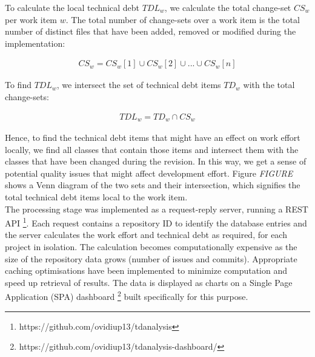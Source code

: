 \documentclass{mpaper}
\begin{document}
To calculate the local technical debt $TDL_{w}$, we calculate the total
change-set $CS_{w}$ per work item $w$. The total number of change-sets over a
work item is the total number of distinct files that have been added, removed or
modified during the implementation:

\begin{equation}
  \label{eq-td-changes}
  \begin{aligned}
    CS_{w} = CS_{w}[1] \cup CS_{w}[2] \cup ... \cup CS_{w}[n]
  \end{aligned}
\end{equation}

To find $TDL_{w}$, we intersect the set of technical debt items $TD_{w}$ with
the total change-sets:

\begin{equation}
  \label{eq-td-local}
  \begin{aligned}
    TDL_{w} = TD_{w} \cap CS_{w}
  \end{aligned}
\end{equation}

Hence, to find the technical debt items that might have an effect on work effort
locally, we find all classes that contain those items and intersect them with
the classes that have been changed during the revision. In this way, we get a
sense of potential quality issues that might affect development effort. Figure
\emph{FIGURE} shows a Venn diagram of the two sets and their intersection, which
signifies the total technical debt items local to the work item.\\

The processing stage was implemented as a request-reply server, running a REST
API \footnote{https://github.com/ovidiup13/tdanalysis}. Each request contains a
repository ID to identify the database entries and the server calculates the
work effort and technical debt as required, for each project in isolation. The
calculation becomes computationally expensive as the size of the repository data
grows (number of issues and commits). Appropriate caching optimisations have
been implemented to minimize computation and speed up retrieval of results. The
data is displayed as charts on a Single Page Application (SPA) dashboard
\footnote{https://github.com/ovidiup13/tdanalysis-dashboard/} built specifically
for this purpose. 


\end{document}
